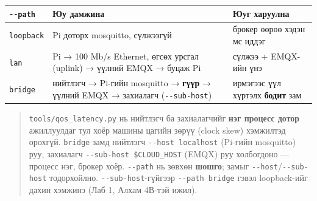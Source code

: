 \begingroup\scriptsize\begin{longtable}[]{@{}lll@{}}
\toprule
\begin{minipage}[b]{0.30\columnwidth}\raggedright
\texttt{-\/-path}\strut
\end{minipage} & \begin{minipage}[b]{0.30\columnwidth}\raggedright
Юу дамжина\strut
\end{minipage} & \begin{minipage}[b]{0.30\columnwidth}\raggedright
Юуг харуулна\strut
\end{minipage}\tabularnewline
\midrule
\endhead
\begin{minipage}[t]{0.30\columnwidth}\raggedright
\texttt{loopback}\strut
\end{minipage} & \begin{minipage}[t]{0.30\columnwidth}\raggedright
Pi доторх mosquitto, сүлжээгүй\strut
\end{minipage} & \begin{minipage}[t]{0.30\columnwidth}\raggedright
брокер өөрөө хэдэн мс иддэг\strut
\end{minipage}\tabularnewline
\begin{minipage}[t]{0.30\columnwidth}\raggedright
\texttt{lan}\strut
\end{minipage} & \begin{minipage}[t]{0.30\columnwidth}\raggedright
Pi → 100 Mb/s Ethernet, өгсөх урсгал (uplink) → үүлний EMQX → буцаж Pi\strut
\end{minipage} & \begin{minipage}[t]{0.30\columnwidth}\raggedright
сүлжээ + EMQX-ийн үнэ\strut
\end{minipage}\tabularnewline
\begin{minipage}[t]{0.30\columnwidth}\raggedright
\texttt{bridge}\strut
\end{minipage} & \begin{minipage}[t]{0.30\columnwidth}\raggedright
нийтлэгч → Pi-гийн mosquitto → \textbf{гүүр} → үүлний EMQX → захиалагч (\texttt{-\/-sub-host})\strut
\end{minipage} & \begin{minipage}[t]{0.30\columnwidth}\raggedright
ирмэгээс үүл хүртэлх \textbf{бодит} зам\strut
\end{minipage}\tabularnewline
\bottomrule
\end{longtable}\endgroup

\begin{quote}
\texttt{tools/\allowbreak{}qos\_\allowbreak{}latency.\allowbreak{}py} нь нийтлэгч ба захиалагчийг \textbf{нэг процесс дотор} ажиллуулдаг тул хоёр машины цагийн зөрүү (clock skew) хэмжилтэд орохгүй. \texttt{bridge} замд нийтлэгч \texttt{-\/\allowbreak{}-host\ localhost} (Pi-гийн mosquitto) руу, захиалагч \texttt{-\/\allowbreak{}-sub-host\ \$CLOUD\_\allowbreak{}HOST} (EMQX) руу холбогдоно --- процесс нэг, брокер хоёр. \texttt{-\/-path} нь зөвхөн \textbf{шошго}; замыг \texttt{-\/-host}/\allowbreak\texttt{-\/-sub-host} тодорхойлно. \texttt{-\/-sub-host}-гүйгээр \texttt{-\/-path\ bridge} гэвэл loopback-ийг дахин хэмжинэ (Лаб 1, Алхам 4В-тэй ижил).
\end{quote}

